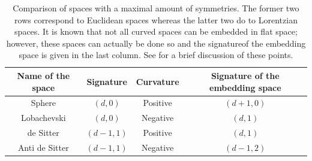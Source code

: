 \documentclass[12pt]{article}
\numberwithin{equation}{section}
\begin{document}
\begin{table}
	\centering
	\caption[Comparison of spaces with a maximal amount of symmetries]{\label{table: comparison of spaces of maximal symmetry}Comparison of spaces with a maximal amount of symmetries. The former two rows correspond to Euclidean spaces whereas the latter two do to Lorentzian spaces. It is known that not all curved spaces can be embedded in flat space; however, these spaces can actually be done so and the signature\footnotemark of the embedding space is given in the last column. See \cite{Nastase:2007kj} for a brief discussion of these points.}
	\begin{tabular}{cccc}
		\hline\hline 
		\textbf{Name of the space}&\textbf{Signature}&\textbf{Curvature}&\textbf{Signature of the embedding space}
		\\\hline
		Sphere&$(d,0)$&Positive&$(d+1,0)$\\
		Lobachevski&$(d,0)$&Negative&$(d,1)$\\
		de Sitter&$(d-1,1)$&Positive&$(d,1)$\\
		Anti de Sitter&$(d-1,1)$&Negative&$(d-1,2)$\\
		\hline\hline 
	\end{tabular}
\end{table}
\end{document}
